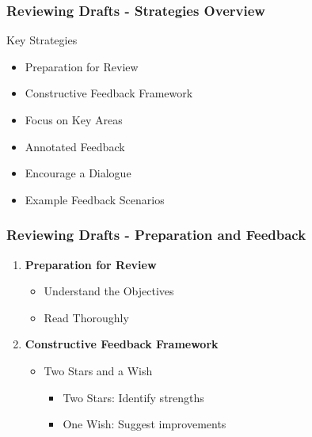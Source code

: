 \documentclass[aspectratio=169]{beamer}
\begin{document}
\begin{frame}[fragile]
    \frametitle{Reviewing Drafts - Strategies Overview}
    \begin{block}{Key Strategies}
        \begin{itemize}
            \item Preparation for Review
            \item Constructive Feedback Framework
            \item Focus on Key Areas
            \item Annotated Feedback
            \item Encourage a Dialogue
            \item Example Feedback Scenarios
        \end{itemize}
    \end{block}
\end{frame}

\begin{frame}[fragile]
    \frametitle{Reviewing Drafts - Preparation and Feedback}
    \begin{enumerate}
        \item \textbf{Preparation for Review}
            \begin{itemize}
                \item Understand the Objectives
                \item Read Thoroughly
            \end{itemize}
        
        \item \textbf{Constructive Feedback Framework}
            \begin{itemize}
                \item Two Stars and a Wish
                \begin{itemize}
                    \item Two Stars: Identify strengths
                    \item One Wish: Suggest improvements
                \end{itemize}
            \end{itemize}
    \end{enumerate}
\end{frame}
\end{document}
